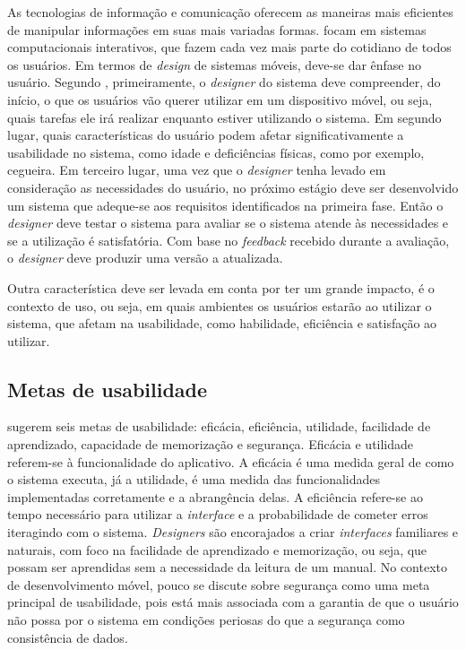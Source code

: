 

As tecnologias de informação e comunicação oferecem as maneiras
mais eficientes de manipular informações em suas mais variadas formas.
 focam em sistemas computacionais interativos,
que fazem cada vez mais parte do cotidiano de todos os usuários.
Em termos de \textit{design} de sistemas móveis, deve-se dar ênfase 
no usuário.  Segundo , primeiramente,
o \textit{designer} do sistema deve compreender, do início, o que os
usuários vão querer utilizar em um dispositivo móvel, ou seja, quais 
tarefas ele irá realizar enquanto estiver utilizando o sistema.  Em
segundo lugar, quais características do usuário podem afetar
significativamente a usabilidade no sistema, como idade e deficiências
físicas, como por exemplo, cegueira.   Em terceiro lugar, uma vez que o \textit{designer}
tenha levado em consideração as necessidades do usuário, no próximo estágio
deve ser desenvolvido um sistema que adeque-se aos
requisitos identificados na primeira fase.  Então o \textit{designer}
deve testar o sistema para avaliar se o sistema atende às necessidades e
se a utilização é satisfatória.  Com base no \textit{feedback} recebido
durante a avaliação, o \textit{designer} deve produzir uma versão a
atualizada.

Outra característica deve ser levada em conta por ter um grande impacto,
é o contexto de uso, ou seja, em quais ambientes os usuários estarão
ao utilizar o sistema, que afetam na usabilidade, como habilidade, 
eficiência e satisfação ao utilizar.

\subsection{Metas de usabilidade}



 sugerem seis metas de usabilidade:
eficácia, eficiência, utilidade, facilidade de aprendizado, capacidade
de memorização e segurança.
Eficácia e utilidade referem-se à funcionalidade do aplicativo.
A eficácia é uma medida geral de como o sistema executa, já a utilidade, é
uma medida das funcionalidades implementadas corretamente e a abrangência
delas.  A eficiência refere-se ao tempo necessário para
utilizar a \textit{interface} e a probabilidade de cometer erros iteragindo
com o sistema.  \textit{Designers} são encorajados a criar 
\textit{interfaces} familiares e naturais, com foco na facilidade de
aprendizado e memorização, ou seja, que possam ser aprendidas
sem a necessidade da leitura de um manual.   No contexto de desenvolvimento
móvel, pouco se discute sobre segurança como uma meta principal de 
usabilidade, pois está mais associada com a garantia de que o usuário
não possa por o sistema em condições periosas do que a segurança como 
consistência de dados.

